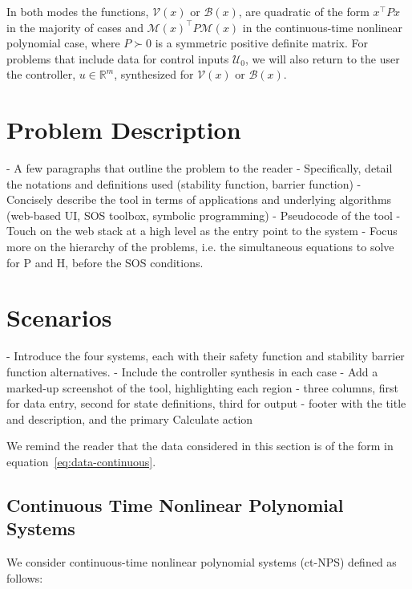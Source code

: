 \documentclass[sigconf]{acmart}
\begin{document}
In both modes the functions, $\mathcal{V}(x)$ or $\mathcal{B}(x)$, are quadratic of the form $x^\top Px$ in the majority of cases and $\mathcal{M}(x)^\top P\mathcal{M}(x)$ in the continuous-time nonlinear polynomial case, where $P\succ 0$ is a symmetric positive definite matrix.
For problems that include data for control inputs $\mathcal{U}_{0}$, we will also return to the user the controller, $u\in\mathbb{R}^m$, synthesized for $\mathcal{V}(x)$ or $\mathcal{B}(x)$.


\section{Problem Description}\label{sec:problem-description}

- A few paragraphs that outline the problem to the reader
- Specifically, detail the notations and definitions used (stability function, barrier function)
- Concisely describe the tool in terms of applications and underlying algorithms (web-based UI, SOS toolbox, symbolic programming)
- Pseudocode of the tool
- Touch on the web stack at a high level as the entry point to the system
- Focus more on the hierarchy of the problems, i.e. the simultaneous equations to solve for P and H, before the SOS conditions.


\section{Scenarios}\label{sec:scenarios}

- Introduce the four systems, each with their safety function and stability barrier function alternatives.
- Include the controller synthesis in each case
- Add a marked-up screenshot of the tool, highlighting each region
- three columns, first for data entry, second for state definitions, third for output
- footer with the title and description, and the primary Calculate action

We remind the reader that the data considered in this section is of the form in equation~\eqref{eq:data-continuous}.

\subsection{Continuous Time Nonlinear Polynomial Systems}\label{subsec:continuous-time-nonlinear-polynomial-systems}
We consider continuous-time nonlinear polynomial systems (ct-NPS) defined as follows:
\end{document}
